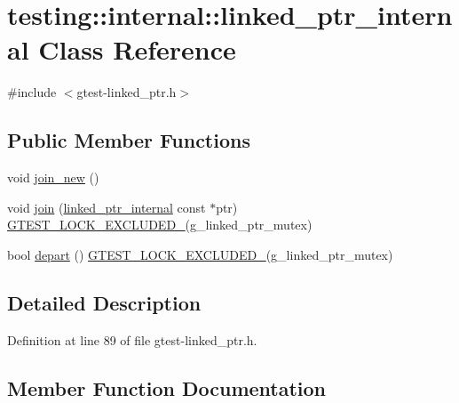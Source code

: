 \hypertarget{classtesting_1_1internal_1_1linked__ptr__internal}{}\section{testing\+:\+:internal\+:\+:linked\+\_\+ptr\+\_\+internal Class Reference}
\label{classtesting_1_1internal_1_1linked__ptr__internal}


{\ttfamily \#include $<$gtest-\/linked\+\_\+ptr.\+h$>$}

\subsection*{Public Member Functions}
\begin{DoxyCompactItemize}
\item 
void \hyperlink{classtesting_1_1internal_1_1linked__ptr__internal_a742af1f65df2d5e2b7198a1b74264a83}{join\+\_\+new} ()
\item 
void \hyperlink{classtesting_1_1internal_1_1linked__ptr__internal_acd5a341459f7e81b10b4112d8c764e2a}{join} (\hyperlink{classtesting_1_1internal_1_1linked__ptr__internal}{linked\+\_\+ptr\+\_\+internal} const $\ast$ptr) \hyperlink{gtest-port_8h_a69abff5a4efdd07bd5faebe3dd318d06}{G\+T\+E\+S\+T\+\_\+\+L\+O\+C\+K\+\_\+\+E\+X\+C\+L\+U\+D\+E\+D\+\_\+}(g\+\_\+linked\+\_\+ptr\+\_\+mutex)
\item 
bool \hyperlink{classtesting_1_1internal_1_1linked__ptr__internal_a8699e539d9702d363ef0351012d1b3ca}{depart} () \hyperlink{gtest-port_8h_a69abff5a4efdd07bd5faebe3dd318d06}{G\+T\+E\+S\+T\+\_\+\+L\+O\+C\+K\+\_\+\+E\+X\+C\+L\+U\+D\+E\+D\+\_\+}(g\+\_\+linked\+\_\+ptr\+\_\+mutex)
\end{DoxyCompactItemize}


\subsection{Detailed Description}


Definition at line 89 of file gtest-\/linked\+\_\+ptr.\+h.



\subsection{Member Function Documentation}
